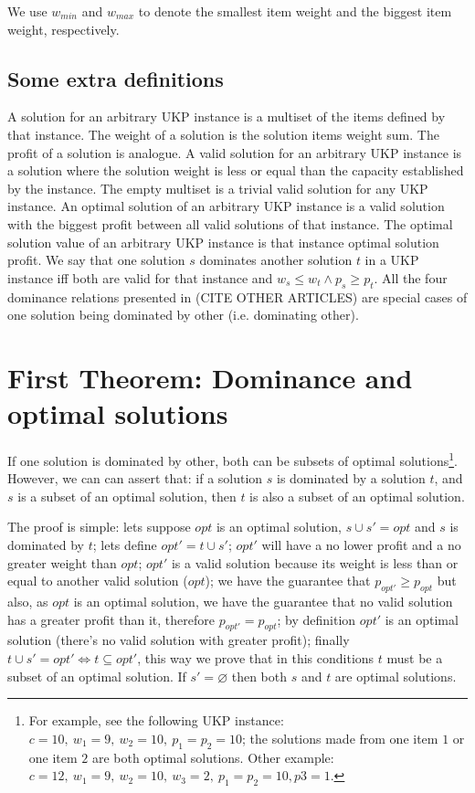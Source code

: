 \documentclass[12pt]{article}
\begin{document}
We use \(w_{min}\) and \(w_{max}\) to denote the smallest item weight and the biggest item weight, respectively.

\subsection{Some extra definitions}

A solution for an arbitrary UKP instance is a multiset of the items defined by that instance. The weight of a solution is the solution items weight sum. The profit of a solution is analogue. A valid solution for an arbitrary UKP instance is a solution where the solution weight is less or equal than the capacity established by the instance. The empty multiset is a trivial valid solution for any UKP instance. An optimal solution of an arbitrary UKP instance is a valid solution with the biggest profit between all valid solutions of that instance. The optimal solution value of an arbitrary UKP instance is that instance optimal solution profit. We say that one solution \(s\) dominates another solution \(t\) in a UKP instance iff both are valid for that instance and \(w_s \leq w_t \land p_s \geq p_t\). All the four dominance relations presented in (CITE OTHER ARTICLES) are special cases of one solution being dominated by other (i.e. dominating other).

\section{First Theorem: Dominance and optimal solutions}

If one solution is dominated by other, both can be subsets of optimal solutions\footnote{For example, see the following UKP instance: \(c = 10,~w_1 = 9,~w_2 = 10,~p_1 = p_2 = 10\); the solutions made from one item \(1\) or one item \(2\) are both optimal solutions. Other example: \(c = 12,~w_1 = 9,~w_2 = 10,~w_3 = 2,~p_1 = p_2 = 10, p3 = 1\).}. However, we can can assert that: if a solution \(s\) is dominated by a solution \(t\), and \(s\) is a subset of an optimal solution, then \(t\) is also a subset of an optimal solution.

The proof is simple: lets suppose \(opt\) is an optimal solution, \(s \cup s' = opt\) and \(s\) is dominated by \(t\); lets define \(opt' = t \cup s'\); \(opt'\) will have a no lower profit and a no greater weight than \(opt\); \(opt'\) is a valid solution because its weight is less than or equal to another valid solution (\(opt\)); we have the guarantee that \(p_{opt'} \geq p_{opt}\) but also, as \(opt\) is an optimal solution, we have the guarantee that no valid solution has a greater profit than it, therefore \(p_{opt'} = p_{opt}\); by definition \(opt'\) is an optimal solution (there's no valid solution with greater profit); finally \(t \cup s' = opt' \iff t \subseteq opt'\), this way we prove that in this conditions \(t\) must be a subset of an optimal solution. If \(s' = \varnothing\) then both \(s\) and \(t\) are optimal solutions.
\end{document}
